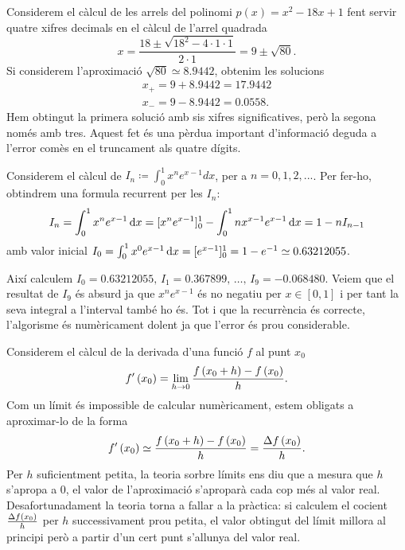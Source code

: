 \begin{example}\label{ej:2_errores}
    Considerem el càlcul de les arrels del polinomi $p(x)=x^2 - 18x +1$ fent servir quatre xifres decimals en el càlcul de l'arrel quadrada  %
    \[
            x = \dfrac{18 \pm \sqrt{18^2 - 4 \cdot 1 \cdot 1}}{2 \cdot 1} = 9 \pm \sqrt{80} \nonumber.
    \]
    Si considerem l'aproximació $\sqrt{80} \simeq 8.9442$, obtenim les solucions
    \begin{gather*}
            x_{+}=9+8.9442=17.9442 \\
            x_{-}=9-8.9442=0.0558.
    \end{gather*}
    Hem obtingut la primera solució amb sis xifres significatives, però la segona només amb tres. Aquest fet és una pèrdua important d'informació deguda a l'error comès en el truncament als quatre dígits.
\end{example}

\begin{example}\label{ej:3_errores}
    Considerem el càlcul de $I_n \coloneqq \int_{0}^{1}x^ne^{x-1}dx$, per a $n = 0,1,2,...$.
    Per fer-ho, obtindrem una formula recurrent per les $I_n$:
    \[
            I_n = \int_{0}^{1}x^ne^{x-1}\dif x = [x^ne^{x-1}]_{0}^{1} - \int_{0}^{1}nx^{x-1}e^{x-1}\dif x = 1 - nI_{n-1} \nonumber
    \]
    amb valor inicial $I_0 = \int_{0}^{1}x^0e^{x-1}\dif x = [e^{x-1}]_{0}^{1} = 1 - e^{-1} \simeq 0.63212055$.
    
    Així calculem $I_0 = 0.63212055,\, I_1 = 0.367899,\, \dots,\, I_9 = -0.068480$. Veiem que el resultat de $I_9$ és absurd ja que $x^ne^{x-1}$ és no negatiu per $x \in [0,1]$ i per tant la seva integral a l'interval també ho és. Tot i que la recurrència és correcte, l'algorisme és numèricament dolent ja que l'error és prou considerable.
\end{example}

\begin{example}\label{ej:4_errores}
    Considerem el càlcul de la derivada d'una funció $f$ al punt $x_0$
    \[
            f'\left( x_0\right)  = \lim\limits_{h \rightarrow 0} \dfrac{f\left( x_0 + h\right)  - f\left( x_0\right) }{h} \nonumber.
    \]
    Com un límit és impossible de calcular numèricament, estem obligats a aproximar-lo de la forma
    \[
            f'\left( x_0\right)  \simeq \dfrac{f\left( x_0 + h\right)  - f\left( x_0\right) }{h} = \frac{\Delta f\left( x_0\right) }{h} \nonumber.
    \]
    Per $h$ suficientment petita, la teoria sorbre límits ens diu que a mesura que $h$ s'apropa a $0$, el valor de l'aproximació s'aproparà cada cop més al valor real. Desafortunadament la teoria torna a fallar a la pràctica: si calculem el cocient $\frac{\Delta f\left( x_0\right) }{h}$ per $h$ successivament prou petita, el valor obtingut del límit millora al principi però a partir d'un cert punt s'allunya del valor real.
\end{example}
    
